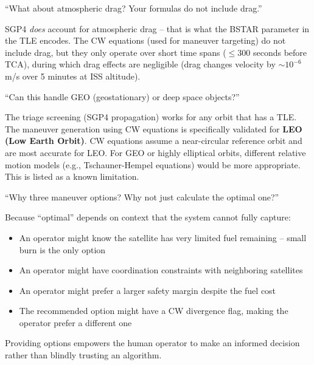 \documentclass[12pt,a4paper]{article}
\begin{document}
\begin{questionbox}
``What about atmospheric drag? Your formulas do not include drag.''
\end{questionbox}
\begin{answerbox}
SGP4 \textit{does} account for atmospheric drag -- that is what the BSTAR parameter in the TLE encodes. The CW equations (used for maneuver targeting) do not include drag, but they only operate over short time spans ($\leq 300$ seconds before TCA), during which drag effects are negligible (drag changes velocity by $\sim 10^{-6}$ m/s over 5 minutes at ISS altitude).
\end{answerbox}

\begin{questionbox}
``Can this handle GEO (geostationary) or deep space objects?''
\end{questionbox}
\begin{answerbox}
The triage screening (SGP4 propagation) works for any orbit that has a TLE. The maneuver generation using CW equations is specifically validated for \textbf{LEO (Low Earth Orbit)}. CW equations assume a near-circular reference orbit and are most accurate for LEO. For GEO or highly elliptical orbits, different relative motion models (e.g., Tschauner-Hempel equations) would be more appropriate. This is listed as a known limitation.
\end{answerbox}

\begin{questionbox}
``Why three maneuver options? Why not just calculate the optimal one?''
\end{questionbox}
\begin{answerbox}
Because ``optimal'' depends on context that the system cannot fully capture:
\begin{itemize}
    \item An operator might know the satellite has very limited fuel remaining -- small burn is the only option
    \item An operator might have coordination constraints with neighboring satellites
    \item An operator might prefer a larger safety margin despite the fuel cost
    \item The recommended option might have a CW divergence flag, making the operator prefer a different one
\end{itemize}
Providing options empowers the human operator to make an informed decision rather than blindly trusting an algorithm.
\end{answerbox}
\end{document}
